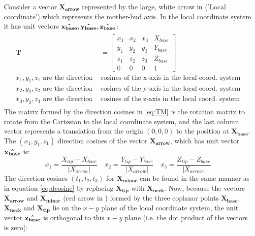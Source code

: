 Consider a vector $\mathbf{X_{arrow}}$ represented by the large, white arrow in  ('Local coordinate') which represents the mother-bud axis. In the local coordinate system it has unit vectors $\mathbf{\hat{x_{base}}},\mathbf{\hat{y_{base}}},\mathbf{\hat{z_{base}}}$:
\begin{equation}\label{eq:TM}
 	\begin{split}
	 	\begin{aligned}
	 		\mathbf{T}&=\begin{bmatrix}
			 		x_{1} &x_{2}&x_{3}&X_{base}\\
			 		y_{1} &y_{2}&y_{3}&Y_{base}\\
			 		z_{1} &z_{2}&z_{3}&Z_{base}\\
			 		0&0&0&1
		 		\end{bmatrix}		\\
		 	x_{1}, y_{1}, z_{1}\text{ are the direction } &\text{cosines of the x-axis in the local coord. system}\\[-1.5ex]
			x_{2}, y_{2}, z_{2}\text{ are the direction } &\text{cosines of the y-axis in the local coord. system}\\[-1.5ex]
			x_{3}, y_{3}, z_{3}\text{ are the direction } &\text{cosines of the z-axis in the local coord. system}
		\end{aligned}
	\end{split}
\end{equation}
The matrix formed by the direction cosines in \eqref{eq:TM} is the rotation matrix to rotate from the Cartesian to the local coordinate system, and the last column vector represents a translation from the origin $(0,0,0)$ to the position at $\mathbf{X_{base}}$.
The $(x_1, y_1, z_1)$ direction cosines of the vector $\mathbf{X_{arrow}}$, which has unit vector $\mathbf{\hat{x_{base}}}$ is:
\begin{equation}\label{eq:dcosine}
	x_{1}= \frac{X_{tip}-X_{base}} {|X_{arrow}|} \quad x_{2}= \frac{Y_{tip}-Y_{base}} {|X_{arrow}|} \quad x_{3}= \frac{Z_{tip}-Z_{base}} {|X_{arrow}|}
\end{equation}
The direction cosines $(t_1, t_2, t_3)$ for $\mathbf{X_{minor}}$ can be found in the same manner as in equation \eqref{eq:dcosine} by replacing $\mathbf{X_{tip}}$ with $\mathbf{X_{neck}}$. 
Now, because the vectors $\mathbf{X_{arrow}}$ and $\mathbf{X_{minor}}$ (red arrow in ) formed by the three coplanar points $\mathbf{X_{base}}$, $\mathbf{X_{neck}}$ and $\mathbf{X_{tip}}$  lie on the $x-y$ plane of the local coordinate system, the unit vector $\mathbf{\hat{z_{base}}}$ is orthogonal to this $x-y$ plane (i.e. the dot product of the vectors is zero):
